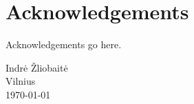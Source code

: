 {}
\chapter*{Acknowledgements}

Acknowledgements go here. 

{\flushright  Indr\.e \v{Z}liobait\.e\\ Vilnius\\ \today\\ }
